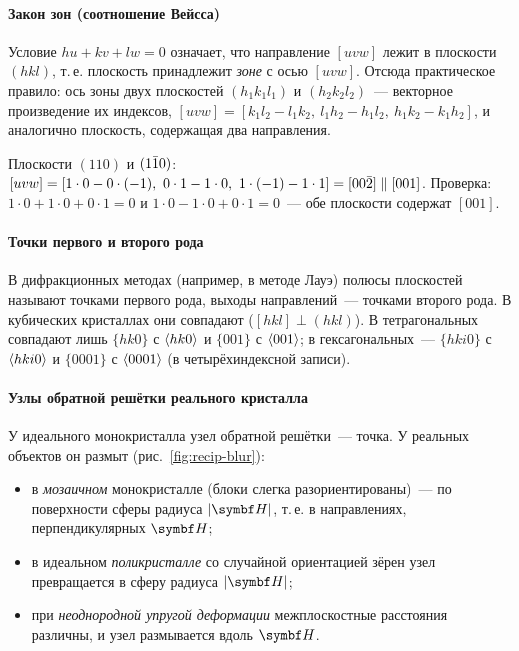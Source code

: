 \paragraph{Закон зон (соотношение Вейсса)}
Условие $hu+kv+lw=0$ означает, что направление $[uvw]$ лежит в плоскости
$(hkl)$, т.\,е. плоскость принадлежит \emph{зоне} с осью $[uvw]$. Отсюда
практическое правило: ось зоны двух плоскостей $(h_1k_1l_1)$ и
$(h_2k_2l_2)$~— векторное произведение их индексов,
$[uvw]=[k_1l_2-l_1k_2,\ l_1h_2-h_1l_2,\ h_1k_2-k_1h_2]$, и аналогично
плоскость, содержащая два направления.

\begin{primer}
Плоскости $(110)$ и $(1\bar{1}0)$: $[uvw]=[1\cdot0-0\cdot(-1),\ 0\cdot1-1\cdot0,\
1\cdot(-1)-1\cdot1]=[00\bar{2}]\parallel[001]$. Проверка: $1\cdot0+1\cdot0+0\cdot1=0$
и $1\cdot0-1\cdot0+0\cdot1=0$~— обе плоскости содержат $[001]$.
\end{primer}

\paragraph{Точки первого и второго рода}
В дифракционных методах (например, в методе Лауэ) полюсы плоскостей
называют точками первого рода, выходы направлений~— точками второго
рода. В кубических кристаллах они совпадают ($[hkl]\perp(hkl)$). В
тетрагональных совпадают лишь $\{hk0\}$ с $\langle hk0\rangle$ и $\{001\}$ с
$\langle 001\rangle$; в гексагональных~— $\{hki0\}$ с $\langle hki0\rangle$ и $\{0001\}$ с
$\langle 0001\rangle$ (в четырёхиндексной записи).

\paragraph{Узлы обратной решётки реального кристалла}
У идеального монокристалла узел обратной решётки~— точка. У реальных
объектов он размыт (рис.~\ref{fig:recip-blur}):
\begin{itemize}
\item в \emph{мозаичном} монокристалле (блоки слегка разориентированы)~—
по поверхности сферы радиуса $|\vb H|$, т.\,е. в направлениях,
перпендикулярных $\vb H$;
\item в идеальном \emph{поликристалле} со случайной ориентацией зёрен узел
превращается в сферу радиуса $|\vb H|$;
\item при \emph{неоднородной упругой деформации} межплоскостные расстояния
различны, и узел размывается вдоль $\vb H$.
\end{itemize}

